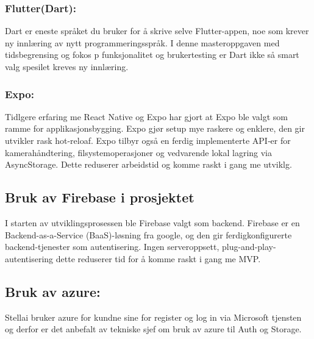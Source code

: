 \subsubsection{Flutter(Dart):} Dart er eneste språket du bruker for å skrive selve Flutter-appen, noe som krever ny innlæring av nytt programmeringsspråk. I denne masteroppgaven med tidsbegrensing og fokos p funksjonalitet og brukertesting er Dart ikke så smart valg spesilet kreves ny innlæring.

\subsubsection{Expo:} Tidlgere erfaring me React Native og Expo har gjort at Expo ble valgt som ramme for applikasjonsbygging. Expo gjør setup mye raskere og enklere, den gir utvikler rask hot-reloaf. Expo tilbyr også en ferdig implementerte API‑er for kamerahåndtering, filsystemoperasjoner og vedvarende lokal lagring via AsyncStorage. Dette reduserer arbeidstid og komme raskt i gang me utviklg. 

\subsection{Bruk av Firebase i prosjektet} I starten av utviklingsprosessen ble Firebase valgt som backend. Firebase er en Backend-as-a-Service (BaaS)-løsning fra google, og den gir ferdigkonfigurerte backend-tjenester som autentisering. Ingen serveroppsett, plug-and-play-autentisering dette reduserer tid for å komme raskt i gang me MVP. 

\subsection{Bruk av azure:} Stellai bruker azure for kundne sine for register og log in via Microsoft tjensten og derfor er det anbefalt av tekniske sjef om bruk av azure til Auth og Storage. 



